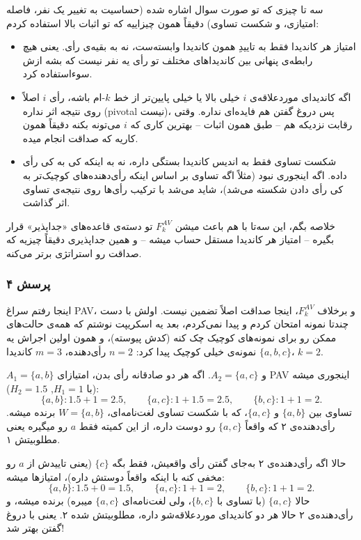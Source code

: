 \documentclass[12pt, a4paper]{article}
\begin{document}
سه تا چیزی که تو صورت سوال اشاره شده (حساسیت به تغییر یک نفر، فاصله امتیازی، و شکست تساوی) دقیقاً همون چیزاییه که تو اثبات بالا استفاده کردم:

\begin{itemize}
\item امتیاز هر کاندیدا فقط به تاییدِ همون کاندیدا وابسته‌ست، نه به بقیه‌ی رأی. یعنی هیچ رابطه‌ی پنهانی بین کاندیداهای مختلف تو رأی یه نفر نیست که بشه ازش سوءاستفاده کرد.
\item اگه کاندیدای موردعلاقه‌ی $i$ خیلی بالا یا خیلی پایین‌تر از خط $k$-ام باشه، رأی $i$ اصلاً روی نتیجه اثر نداره (pivotal نیست)، پس دروغ گفتن هم فایده‌ای نداره. وقتی رقابت نزدیکه هم -- طبق همون اثبات -- بهترین کاری که $i$ می‌تونه بکنه دقیقاً همون کاریه که صداقت انجام میده.
\item شکست تساوی فقط به اندیس کاندیدا بستگی داره، نه به اینکه کی به کی رأی داده. اگه اینجوری نبود (مثلاً اگه تساوی بر اساس اینکه رأی‌دهنده‌های کوچیک‌تر به کی رأی دادن شکسته می‌شد)، شاید می‌شد با ترکیب رأی‌ها روی نتیجه‌ی تساوی اثر گذاشت.
\end{itemize}

خلاصه بگم، این سه‌تا با هم باعث میشن $F_k^{AV}$ تو دسته‌ی قاعده‌های «جداپذیر» قرار بگیره -- امتیاز هر کاندیدا مستقل حساب میشه -- و همین جداپذیری دقیقاً چیزیه که صداقت رو استراتژی برتر می‌کنه.

\subsubsection*{پرسش ۴}

اینجا رفتم سراغ PAV، و برخلاف $F_k^{AV}$، اینجا صداقت اصلاً تضمین نیست. اولش با دست چندتا نمونه امتحان کردم و پیدا نمی‌کردم، بعد یه اسکریپت نوشتم که همه‌ی حالت‌های ممکن رو برای نمونه‌های کوچیک چک کنه (کدش پیوسته)، و همون اولین اجراش یه نمونه‌ی خیلی کوچیک پیدا کرد: $n=2$ رأی‌دهنده، $m=3$ کاندیدا $\{a,b,c\}$، $k=2$.

$A_1=\{a,b\}$ و $A_2=\{a,c\}$. اگه هر دو صادقانه رأی بدن، امتیازای PAV اینجوری میشه (با $H_1=1$, $H_2=1.5$):
\[
\{a,b\}: 1.5+1=2.5, \qquad \{a,c\}: 1+1.5=2.5, \qquad \{b,c\}: 1+1=2.
\]
تساوی بین $\{a,b\}$ و $\{a,c\}$، که با شکست تساوی لغت‌نامه‌ای، $W=\{a,b\}$ برنده میشه. رأی‌دهنده‌ی ۲ که واقعاً $\{a,c\}$ رو دوست داره، از این کمیته فقط $a$ رو میگیره یعنی مطلوبیتش ۱.

حالا اگه رأی‌دهنده‌ی ۲ به‌جای گفتن رأی واقعیش، فقط بگه $\{c\}$ (یعنی تاییدش از $a$ رو مخفی کنه با اینکه واقعاً دوستش داره)، امتیازها میشه:
\[
\{a,b\}: 1.5+0=1.5,\qquad \{a,c\}: 1+1=2,\qquad \{b,c\}: 1+1=2.
\]
حالا $\{a,c\}$ (با تساوی با $\{b,c\}$، ولی لغت‌نامه‌ای $\{a,c\}$ میبره) برنده میشه، و رأی‌دهنده‌ی ۲ حالا هر دو کاندیدای موردعلاقه‌شو داره، مطلوبیتش شده ۲. یعنی با دروغ گفتن بهتر شد!
\end{document}
